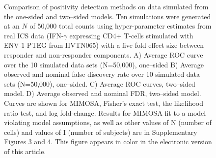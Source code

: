 \documentclass[12pt,oupdraft]{biostatistics}
\begin{document}
\begin{figure}
%
   \caption{Comparison of positivity detection methods on data simulated from the one-sided and two--sided models. Ten simulations were generated at an $N$ of 50,000 total counts using hyper-parameter estimates from real ICS data (IFN-$\gamma$ expressing CD4+ T-cells stimulated with ENV-1-PTEG from HVTN065) with a five-fold effect size between responder and non-responder components. A) Average ROC curve over the 10 simulated data sets (N=50,000), one--sided B) Average observed and nominal false discovery rate over 10 simulated data sets (N=50,000), one--sided. C) Average ROC curves, two--sided model. D) Average observed and nominal FDR, two--sided model. Curves are shown for MIMOSA, Fisher's exact test, the likelihood ratio test, and log fold-change. Results for MIMOSA fit to a model violating model assumptions, as well as other values of N (number of cells) and values of I (number of subjects) are in Supplementary Figures 3 and 4. This figure appears in color in the electronic version of this article.}\label{fig:simulations}
\end{figure}
\end{document}
